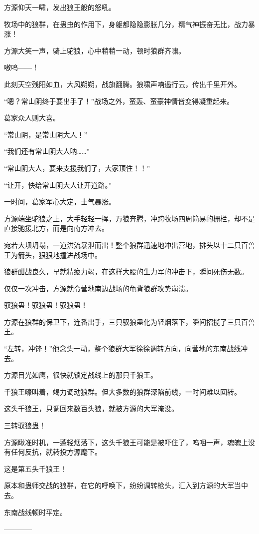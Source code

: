 \begin{this_body}
方源仰天一啸，发出狼王般的怒吼。

牧场中的狼群，在蛊虫的作用下，身躯都隐隐膨胀几分，精气神振奋无比，战力暴涨！

方源大笑一声，骑上驼狼，心中稍稍一动，顿时狼群齐啸。

嗷呜――！

此刻天空残阳如血，大风朔朔，战旗翻腾。狼啸声响遏行云，传出千里开外。

“嗯？常山阴终于要出手了！”战场之外，蛮轰、蛮豪神情皆变得凝重起来。

葛家众人则大喜。

“常山阴，是常山阴大人！”

“我们还有常山阴大人呐……”

“常山阴大人，要来支援我们了，大家顶住！！”

“让开，快给常山阴大人让开道路。”

一时间，葛家军心大定，士气暴涨。

方源端坐驼狼之上，大手轻轻一挥，万狼奔腾，冲跨牧场四周简易的栅栏，却不是直接驰援北方，而是向南方冲去。

宛若大坝坍塌，一道洪流暴泄而出！整个狼群迅速地冲出营地，排头以十二只百兽王为箭头，狠狠地撞进战场中。

狼群酣战良久，早就精疲力竭，在这样大股的生力军的冲击下，瞬间死伤无数。

仅仅一次冲击，方源就令营地南边战场的龟背狼群攻势崩溃。

驭狼蛊！驭狼蛊！驭狼蛊！

方源在狼群的保卫下，连番出手，三只驭狼蛊化为轻烟落下，瞬间招揽了三只百兽王。

“左转，冲锋！”他念头一动，整个狼群大军徐徐调转方向，向营地的东南战线冲去。

方源目光如鹰，很快就锁定战线上的那只千狼王。

千狼王嚎叫着，竭力调动狼群。但大多数的狼群深陷前线，一时间难以回转。

这头千狼王，只调回来数百头狼，就被方源的大军淹没。

三转驭狼蛊！

方源瞅准时机，一蓬轻烟落下，这头千狼王可能是被吓住了，呜咽一声，魂魄上没有任何反抗，就转投方源麾下。

这是第五头千狼王！

原本和蛊师交战的狼群，在它的呼唤下，纷纷调转枪头，汇入到方源的大军当中去。

东南战线顿时平定。

------------

\end{this_body}

